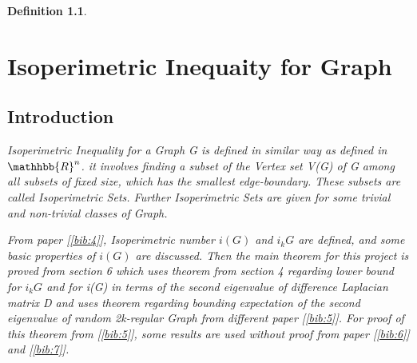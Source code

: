 \documentclass[oneside]{book}
\newtheorem{mydef}{Definition}
\begin{document}
\begin{mydef}
    
    
    
    
    
    
    
    
    
    
    
    
    
    
    \chapter{Isoperimetric Inequaity for Graph}
    \section{Introduction}
  \label{s:5}
 
  Isoperimetric Inequality for a Graph G is defined in similar way as defined in $\mathhbb{R}^n$. it involves finding a subset of the Vertex set V(G) of G among all subsets of fixed size, which has the smallest edge-boundary. These subsets are called Isoperimetric Sets. Further  Isoperimetric Sets are given for some trivial and non-trivial classes of Graph. \par 
    From paper [\ref{bib:4}], Isoperimetric number $i(G)$ and $i_k{G}$ are defined, and some basic properties of $i(G)$  are discussed. Then the main theorem for this project is proved from section 6 which uses theorem from section 4 regarding lower bound for $i_k{G}$ and for i(G) in terms of the second eigenvalue of difference Laplacian matrix D and uses theorem regarding bounding expectation of the second eigenvalue of random 2k-regular Graph from different paper [\ref{bib:5}]. For proof of this theorem from [\ref{bib:5}], some results are used without proof from paper [\ref{bib:6}] and [\ref{bib:7}].
    
    \hfill \break
    

\end{mydef}
\end{document}
